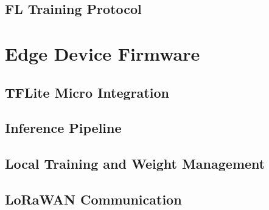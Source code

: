 \subsection{FL Training Protocol}

\section{Edge Device Firmware}
\label{sec:firmware}

\subsection{TFLite Micro Integration}

\subsection{Inference Pipeline}

\subsection{Local Training and Weight Management}

\subsection{LoRaWAN Communication}

